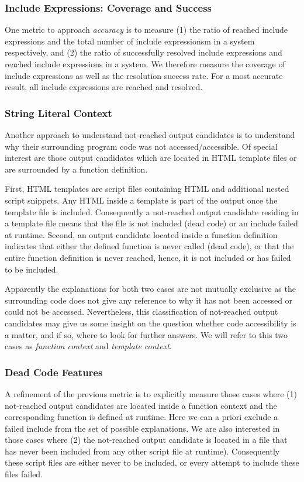 \documentclass{sig-alternate-05-2015}
\begin{document}
\subsubsection{Include Expressions: Coverage and Success} \label{include_coverage_section}
One metric to approach \emph{accuracy} is to measure (1) the ratio of reached
include expressions and the total number of include expressionsm in a system
respectively, and (2) the ratio of successfully resolved include expressions and
reached include expressions in a system. We therefore measure the coverage
of include expressions as well as the resolution success rate. For a most
accurate result, all include expressions are reached and resolved.

\subsubsection{String Literal Context} \label{context_section}
Another approach to understand not-reached output candidates is to understand why their surrounding program code was not accessed/accessible. Of special interest are those output candidates which are located in HTML template files or are surrounded by a function definition. 

First, HTML templates are script files containing HTML and additional nested script snippets. Any HTML inside a template is part of the output once the template file is included. Consequently a not-reached output candidate residing in a template file means that the file is not included (dead code) or an include failed at runtime. Second, an output candidate located inside a function definition indicates that either the defined function is never called (dead code), or that the entire function definition is never reached, hence, it is not included or has failed to be included.

Apparently the explanations for both two cases are not mutually exclusive as the surrounding code does not give any reference to why it has not been accessed or could not be accessed. Nevertheless, this classification of not-reached output candidates may give us some insight on the question whether code accessibility is a matter, and if so, where to look for further answers. We will refer to this two cases as \emph{function context} and \emph{template context}.

\subsubsection{Dead Code Features} \label{dead_feature_section}
A refinement of the previous metric is to explicitly measure those cases where (1) not-reached output candidates are located inside a function context and the corresponding function is defined at runtime. Here we can a priori exclude a failed include from the set of possible explanations. We are also interested in those cases where (2) the not-reached output candidate is located in a file that has never been included from any other script file at runtime). Consequently these script files are either never to be included, or every attempt to include these files failed.
\end{document}
